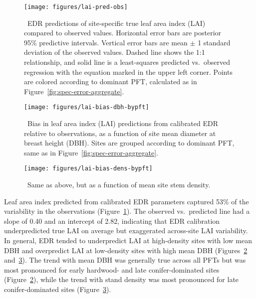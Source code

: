 \begin{figure}
  \centering
  \texttt{[image: figures/lai-pred-obs]}
  \caption{\
    EDR predictions of site-specific true leaf area index (LAI) compared to observed values.
    Horizontal error bars are posterior 95\% predictive intervals.
    Vertical error bars are mean $\pm$ 1 standard deviation of the observed values.
    Dashed line shows the 1:1 relationship, and solid line is a least-squares predicted vs.\ observed regression with the equation marked in the upper left corner.
    Points are colored according to dominant PFT, calculated as in Figure~\ref{fig:spec-error-aggregate}.
  }\label{fig:lai-pred-obs}
\end{figure}

\begin{figure}
  \centering
  \texttt{[image: figures/lai-bias-dbh-bypft]}
  \caption{\
    Bias in leaf area index (LAI) predictions from calibrated EDR relative to observations,
    as a function of site mean diameter at breast height (DBH).
    Sites are grouped according to dominant PFT, same as in Figure~\ref{fig:spec-error-aggregate}.
  }\label{fig:lai-bias-dbh-bypft}
\end{figure}

\begin{figure}
  \centering
  \texttt{[image: figures/lai-bias-dens-bypft]}
  \caption{\
    Same as above, but as a function of mean site stem density.
  }\label{fig:lai-bias-dens-bypft}
\end{figure}

Leaf area index predicted from calibrated EDR parameters captured 53\% of the variability in the observations (Figure~\ref{fig:lai-pred-obs}).
The observed vs.\ predicted line had a slope of 0.40 and an intercept of 2.82, indicating that EDR calibration underpredicted true LAI on average but exaggerated across-site LAI variability.
In general, EDR tended to underpredict LAI at high-density sites with low mean DBH and overpredict LAI at low-density sites with high mean DBH (Figures~\ref{fig:lai-bias-dbh-bypft} and~\ref{fig:lai-bias-dens-bypft}).
The trend with mean DBH was generally true across all PFTs but was most pronounced for early hardwood- and late conifer-dominated sites (Figure~\ref{fig:lai-bias-dbh-bypft}),
while the trend with stand density was most pronounced for late conifer-dominated sites (Figure~\ref{fig:lai-bias-dens-bypft}).

